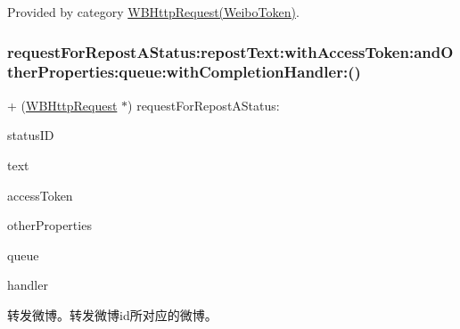 Provided by category \mbox{\hyperlink{category_w_b_http_request_07_weibo_token_08_a64ee3aba6d2b2251083753cef8ad4002}{W\+B\+Http\+Request(\+Weibo\+Token)}}.

\mbox{\label{interface_w_b_http_request_ae32a41361851196fcf0ffc22b4354581}} 
\subsubsection{\texorpdfstring{request\+For\+Repost\+A\+Status\+:repost\+Text\+:with\+Access\+Token\+:and\+Other\+Properties\+:queue\+:with\+Completion\+Handler\+:()}{requestForRepostAStatus:repostText:withAccessToken:andOtherProperties:queue:withCompletionHandler:()}\hspace{0.1cm}{\footnotesize\ttfamily [1/3]}}
{\footnotesize\ttfamily + (\mbox{\hyperlink{interface_w_b_http_request}{W\+B\+Http\+Request}} $\ast$) request\+For\+Repost\+A\+Status\+: \begin{DoxyParamCaption}\item[{(N\+S\+String $\ast$)}]{status\+ID }\item[{repostText:(N\+S\+String $\ast$)}]{text }\item[{withAccessToken:(N\+S\+String $\ast$)}]{access\+Token }\item[{andOtherProperties:(N\+S\+Dictionary $\ast$)}]{other\+Properties }\item[{queue:(N\+S\+Operation\+Queue $\ast$)}]{queue }\item[{withCompletionHandler:(W\+B\+Request\+Handler)}]{handler }\end{DoxyParamCaption}}

转发微博。转发微博id所对应的微博。


